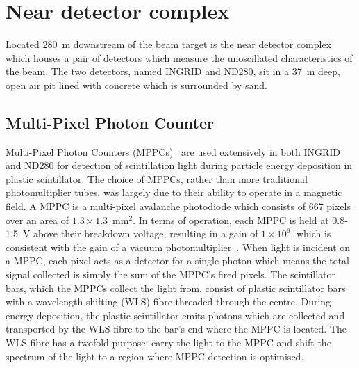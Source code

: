 \section{Near detector complex}
\label{sec:NearDetectorComplex}
Located 280~m downstream of the beam target is the near detector complex which houses a pair of detectors which measure the unoscillated characteristics of the beam.  The two detectors, named INGRID and ND280, sit in a 37~m deep, open air pit lined with concrete which is surrounded by sand.

\subsection{Multi-Pixel Photon Counter}
\label{subsec:MPPC}
Multi-Pixel Photon Counters (MPPCs)~\cite{1748-0221-4-04-P04004} are used extensively in both INGRID and ND280 for detection of scintillation light during particle energy deposition in plastic scintillator.  The choice of MPPCs, rather than more traditional photomultiplier tubes, was largely due to their ability to operate in a magnetic field.  A MPPC is a multi-pixel avalanche photodiode which consists of 667 pixels over an area of $1.3\times1.3$~mm$^2$.  In terms of operation, each MPPC is held at 0.8-1.5~V above their breakdown voltage, resulting in a gain of $1\times10^6$, which is consistent with the gain of a vacuum photomultiplier~\cite{Abe2011106}.  When light is incident on a MPPC, each pixel acts as a detector for a single photon which means the total signal collected is simply the sum of the MPPC's fired pixels.
\newline
\newline
The scintillator bars, which the MPPCs collect the light from, consist of plastic scintillator bars with a wavelength shifting (WLS) fibre threaded through the centre.  During energy deposition, the plastic scintillator emits photons which are collected and transported by the WLS fibre to the bar's end where the MPPC is located.  The WLS fibre has a twofold purpose: carry the light to the MPPC and shift the spectrum of the light to a region where MPPC detection is optimised.

